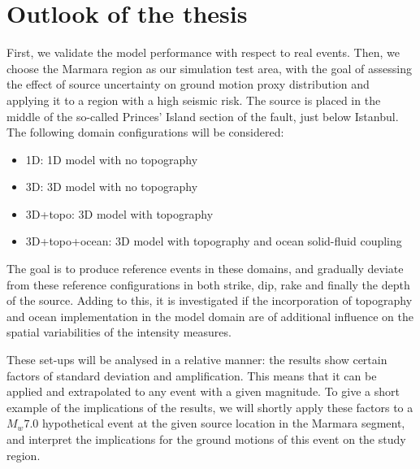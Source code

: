\documentclass[../Text/00main.tex]{subfiles}
\begin{document}


\section{Outlook of the thesis}

First, we validate the model performance with respect to real events. Then, we choose the Marmara region as our simulation test area, with the goal of assessing the effect of source uncertainty on ground motion proxy distribution and applying it to a region with a high seismic risk. The source is placed in the middle of the so-called Princes' Island section of the fault, just below Istanbul. The following domain configurations will be considered:

\begin{itemize}
    \item 1D: 1D model with no topography
    \item 3D: 3D model with no topography
    \item 3D+topo: 3D model with topography
    \item 3D+topo+ocean: 3D model with topography and ocean solid-fluid coupling
\end{itemize}


The goal is to produce reference events in these domains, and gradually deviate from these reference configurations in both strike, dip, rake and finally the depth of the source. Adding to this, it is investigated if the incorporation of topography and ocean implementation in the model domain are of additional influence on the spatial variabilities of the intensity measures. 

These set-ups will be analysed in a relative manner: the results show certain factors of standard deviation and amplification. This means that it can be applied and extrapolated to any event with a given magnitude. To give a short example of the implications of the results, we will shortly apply these factors to a $M_w 7.0$ hypothetical event at the given source location in the Marmara segment, and interpret the implications for the ground motions of this event on the study region. 
\end{document}
